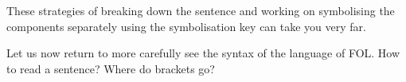 These strategies of breaking down the sentence and working on symbolising the components separately using the symbolisation key can take you very far.

Let us now return to more carefully see the syntax of the language of FOL. How to read a sentence? Where do brackets go? 

%
%
%
%
%
%
%
